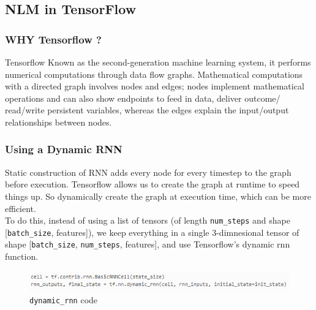  \subsection{NLM in TensorFlow}
 \subsubsection{WHY Tensorflow ?}  
Tensorflow Known as the second-generation machine learning system, it performs numerical computations through data flow graphs. Mathematical computations with a directed graph involves nodes and edges; nodes implement mathematical operations and can also show endpoints to feed in data, deliver outcome/ read/write persistent variables, whereas the edges explain the input/output relationships between nodes. 
 \subsubsection{Using a Dynamic RNN}
 Static construction of RNN adds every node for every timestep to the graph before execution. Tensorflow allows us to create the graph at runtime to speed things up. So dynamically create the graph at execution time, which can be more efficient.\\
 To do this, instead of using a list of tensors (of length \texttt{num\_steps} and shape  [\texttt{batch\_size}, features]), we keep everything in a single 3-dimnesional tensor of shape  [\texttt{batch\_size}, \texttt{num\_steps}, features], and use Tensorflow’s dynamic rnn function.\cite{web013}
   \begin{figure}[H]%
    \center%
    \includegraphics[width=\textwidth]{images/amir/dy_rnn.png}%
    \caption[This is a dynamic rnn code image]{\texttt{dynamic\_rnn} code}\label{fig:dynamic rnn}%
  \end{figure}
